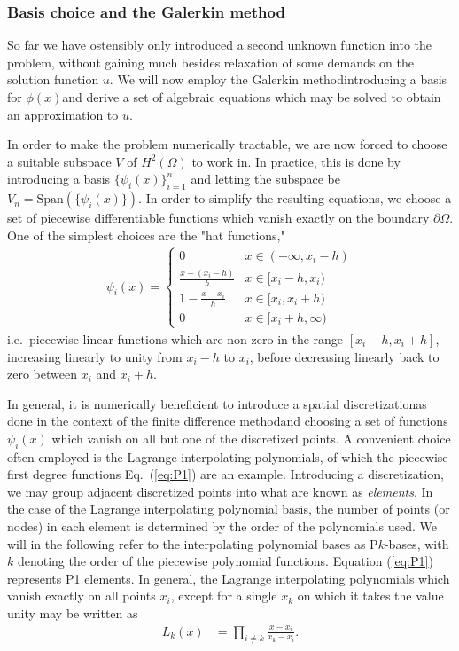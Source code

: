\documentclass[a4paper, twocolumn]{article}
\newcommand{\eq} [1]{Eq.\ (\ref{eq:#1})}
\begin{document}
\subsubsection{Basis choice and the Galerkin method}
So far we have ostensibly only introduced a second unknown function into the problem, without gaining much besides relaxation of some demands on the solution function $u$. We will now employ the Galerkin method\textemdash introducing a basis for $\phi(x)$\textemdash and derive a set of algebraic equations which may be solved to obtain an approximation to $u$. 

In order to make the problem numerically tractable, we are now forced to choose a suitable subspace $V$ of $H^2(\Omega)$ to work in. In practice, this is done by introducing a basis $\{\psi_i(x)\}_{i=1}^n$ and letting the subspace be $V_n=\text{Span}(\{\psi_i(x)\})$. In order to simplify the resulting equations, we choose a set of piecewise differentiable functions which vanish exactly on the boundary $\partial \Omega$. One of the simplest choices are the "hat functions,"
\begin{align}
\psi_i(x)=\left\{ \begin{matrix}
0                   & x\in (-\infty, x_i-h) \\%
\frac{x-(x_i-h)}{h} & x\in [x_i-h, x_i) \\%
1- \frac{x-x_i}{h}  & x\in [x_i, x_i+h) \\%
0                   & x\in [x_i+h, \infty)%
\end{matrix}\right. \label{eq:P1}
\end{align}
i.e.\ piecewise linear functions which are non-zero in the range $[x_i-h, x_i+h]$, increasing linearly to unity from $x_i-h$ to $x_i$, before decreasing linearly back to zero between $x_i$ and $x_i+h$. 

In general, it is numerically beneficient to introduce a spatial discretization\textemdash as done in the context of the finite difference method\textemdash and choosing a set of functions $\psi_i(x)$ which vanish on all but one of the discretized points. A convenient choice often employed is the Lagrange interpolating polynomials, of which the piecewise first degree functions \eq{P1} are an example. Introducing a discretization, we may group adjacent discretized points into what are known as \textit{elements}. In the case of the Lagrange interpolating polynomial basis, the number of points (or nodes) in each element is determined by the order of the polynomials used. We will in the following refer to the interpolating polynomial bases as P$k$-bases, with $k$ denoting the order of the piecewise polynomial functions. Equation (\ref{eq:P1}) represents P1 elements. In general, the Lagrange interpolating polynomials which vanish exactly on all points $x_i$, except for a single $x_k$ on which it takes the value unity may be written as
\begin{align}
L_k(x) &= \prod_{i\not=k}\frac{x-x_i}{x_k-x_i}.
\end{align}
\end{document}
